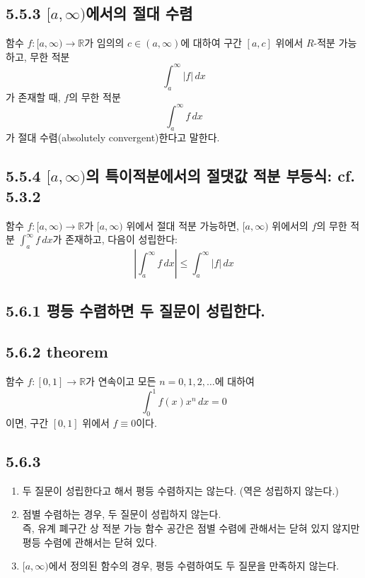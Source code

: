 \documentclass{article}
\begin{document}
\subsection*{5.5.3 \([a, \infty)\)에서의 절대 수렴}

함수 \( f: [a, \infty) \to \mathbb{R} \)가 임의의 \( c \in (a, \infty) \)에 대하여 구간 \( [a, c] \) 위에서 \({R} \)-적분 가능하고, 무한 적분
\[
\int_a^\infty |f| \, dx
\]
가 존재할 때, \( f \)의 무한 적분
\[
\int_a^\infty f \, dx
\]
가 절대 수렴(absolutely convergent)한다고 말한다.

\subsection*{5.5.4 \([a, \infty)\)의 특이적분에서의 절댓값 적분 부등식: cf. 5.3.2}

함수 \( f: [a, \infty) \to \mathbb{R} \)가 \( [a, \infty) \) 위에서 절대 적분 가능하면, \( [a, \infty) \) 위에서의 \( f \)의 무한 적분 \( \int_a^\infty f \, dx \)가 존재하고, 다음이 성립한다:
\[
\left| \int_a^\infty f \, dx \right| \leq \int_a^\infty |f| \, dx
\]

\setcounter{subsection}{5}
\subsection{\fontsize{11.5}{13}\selectfont{다음의 두 질문을 고려하자: \\ 
(1)구간에서 정의된 적분가능함수열의 극한함수 f의 \\적분가능성?\\
(2)극한함수 f가 적분가능하면 극한기호와 적분기호는 \\교환가능한가?}}

\subsection*{5.6.1 평등 수렴하면 두 질문이 성립한다.}

\subsection*{5.6.2 theorem}

함수 \( f: [0, 1] \to \mathbb{R} \)가 연속이고 모든 \( n = 0, 1, 2, \dots \)에 대하여
\[
\int_0^1 f(x) x^n \, dx = 0
\]
이면, 구간 \( [0, 1] \) 위에서 \( f \equiv 0 \)이다.

\subsection*{5.6.3}

\begin{enumerate}
    \item 두 질문이 성립한다고 해서 평등 수렴하지는 않는다. (역은 성립하지 않는다.)
    \item 점별 수렴하는 경우, 두 질문이 성립하지 않는다. \\
    즉, 유계 폐구간 상 적분 가능 함수 공간은 점별 수렴에 관해서는 닫혀 있지 않지만 평등 수렴에 관해서는 닫혀 있다.
    \item \( [a, \infty) \)에서 정의된 함수의 경우, 평등 수렴하여도 두 질문을 만족하지 않는다.
\end{enumerate}
\end{document}
